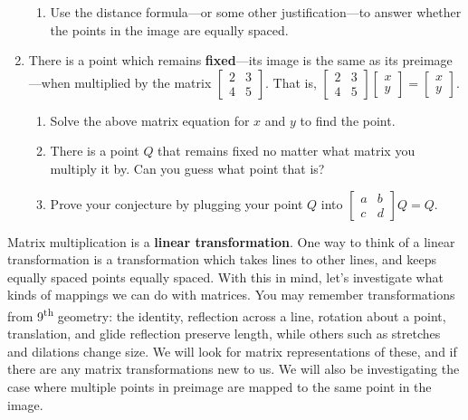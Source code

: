 \documentclass[../gatm.tex]{subfiles}
\begin{document}
\begin{enumerate}
\begin{enumerate}
\item Use the distance formula---or some other justification---to answer whether the points in the image are equally spaced.
\end{enumerate}
\item There is a point which remains \textbf{fixed}---its image is the same as its preimage---when multiplied by the matrix $\left[\begin{array}{cc}2 & 3 \\ 4 & 5 \end{array}\right]$. That is, $\left[\begin{array}{cc}2 & 3 \\ 4 & 5 \end{array}\right]\left[\begin{array}{c} x \\ y \end{array}\right]=\left[\begin{array}{c} x \\ y \end{array}\right]$.
\begin{enumerate}
\item Solve the above matrix equation for $x$ and $y$ to find the point.
\item There is a point $Q$ that remains fixed no matter what matrix you multiply it by. Can you guess what point that is?
\item Prove your conjecture by plugging your point $Q$ into $\left[\begin{array}{cc}a & b \\ c & d\end{array}\right]Q=Q$.
\end{enumerate}
\setcounter{mp_problem_i}{\value{enumi}}
\end{enumerate}

Matrix multiplication is a \textbf{linear transformation}. One way to think of a linear transformation is a transformation which takes lines to other lines, and keeps equally spaced points equally spaced. With this in mind, let's investigate what kinds of mappings we can do with matrices. You may remember transformations from 9\textsuperscript{th} geometry: the identity, reflection across a line, rotation about a point, translation, and glide reflection preserve length, while others such as stretches and dilations change size. We will look for matrix representations of these, and if there are any matrix transformations new to us. We will also be investigating the case where multiple points in preimage are mapped to the same point in the image.
\end{document}
